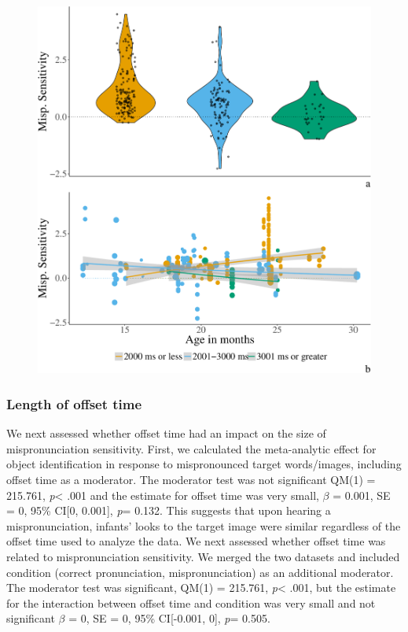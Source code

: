 \documentclass[man]{apa6}
\theoremstyle{definition}
\theoremstyle{definition}
\theoremstyle{definition}
\theoremstyle{remark}
\begin{document}
\begin{figure}[htbp]
\centering
\includegraphics{Paper_Analyses_files/figure-latex/Plot_post_name_cond_age-1.pdf}
\caption{}
\end{figure}

\subsubsection{Length of offset time}\label{length-of-offset-time}

We next assessed whether offset time had an impact on the size of
mispronunciation sensitivity. First, we calculated the meta-analytic
effect for object identification in response to mispronounced target
words/images, including offset time as a moderator. The moderator test
was not significant QM(1) = 215.761, \emph{p}\textless{} .001 and the
estimate for offset time was very small, \(\beta\) = 0.001, SE = 0, 95\%
CI{[}0, 0.001{]}, \emph{p}= 0.132. This suggests that upon hearing a
mispronunciation, infants' looks to the target image were similar
regardless of the offset time used to analyze the data. We next assessed
whether offset time was related to mispronunciation sensitivity. We
merged the two datasets and included condition (correct pronunciation,
mispronunciation) as an additional moderator. The moderator test was
significant, QM(1) = 215.761, \emph{p}\textless{} .001, but the estimate
for the interaction between offset time and condition was very small and
not significant \(\beta\) = 0, SE = 0, 95\% CI{[}-0.001, 0{]}, \emph{p}=
0.505.
\end{document}
